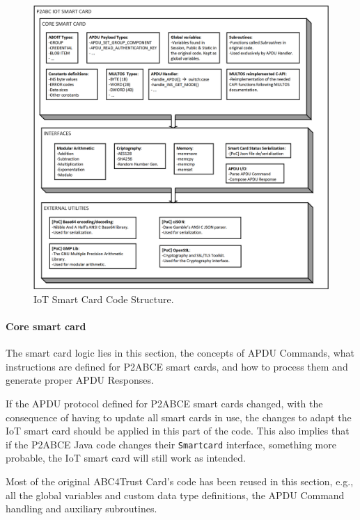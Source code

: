\documentclass[journal]{IEEEtran}
\begin{document}
\begin{figure}[bth]
	\begin{center}
		\includegraphics[width=\linewidth]{gfx/IoTCScomponents-bw}
	\end{center}
	\caption{IoT Smart Card Code Structure.}
	\label{fig:IoTCScomponents-bw}
\end{figure}


\hfil

\paragraph{Core smart card}
\hfil

The smart card logic lies in this section, the concepts of APDU Commands, what instructions are defined for P2ABCE smart cards, and how to process them and generate proper APDU Responses.

If the APDU protocol defined for P2ABCE smart cards changed, with the consequence of having to update all smart cards in use, the changes to adapt the IoT smart card should be applied in this part of the code. This also implies that if the P2ABCE Java code changes their \texttt{Smartcard} interface, something more probable, the IoT smart card will still work as intended.

Most of the original ABC4Trust Card's code has been reused in this section, e.g., all the global variables and custom data type definitions, the APDU Command handling and auxiliary subroutines.
\end{document}
